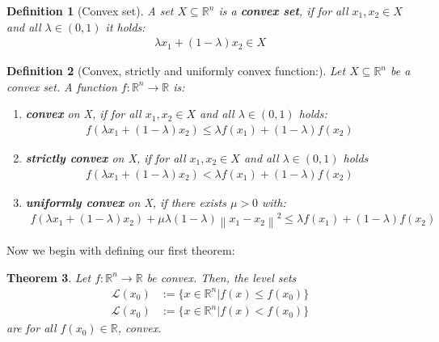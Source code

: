 \documentclass[a4paper, 11pt]{report}
\theoremstyle{break}
\newtheorem{definition}{Definition}[chapter]
\newtheorem{theorem}[definition]{Theorem}
\theoremstyle{proofstyle}
\newcommand{\R}{\mathbb{R}}
\begin{document}
\begin{definition}[Convex set]
	A set $X \subseteq \R^n$  is a \textbf{convex set}, if for all $x_1, x_2\in X$ and all $\lambda\in(0,1)$ it holds: 
	\begin{align}
		\lambda x_1 + (1-\lambda) x_2\in X \label{definition:1:convexset} %
	\end{align}
\end{definition} 

\begin{definition}[Convex, strictly and uniformly convex function:]
	Let $X\subseteq\R^n$ be a convex set. A function $f:\R^n\rightarrow\R$ is:
	\begin{enumerate}   
	    \item \textbf{convex} on X, if for all $x_1, x_2 \in X$ and all $\lambda\in(0,1)$ holds: 
		\begin{align}
		    f(\lambda x_1 + (1-\lambda) x_2) \le \lambda f(x_1)+(1-\lambda)f(x_2)
		    \label{definition:2:convex} %
		\end{align}
	
	     \item \textbf{strictly convex} on X, if for all \(x_1, x_2\in{X}\) and all \(\lambda\in(0,1)\) holds
		\begin{align}
		   f(\lambda{x_1} + (1-\lambda){x_2}) < \lambda f(x_1)+(1-\lambda)f(x_2)
		   \label{definition:3:strictlyconvex}
		\end{align}
		
		\item \textbf{uniformly convex} on X, if there exists $\mu > 0$ with:
		\begin{align}
		    f(\lambda x_1 + (1-\lambda) x_2) + \mu\lambda (1-\lambda)\left\lVert x_1-x_2\right\rVert^2 \le \lambda f(x_1)+(1-\lambda)f(x_2)
		    \label{definition:4:uniconvex}
		\end{align}
	\end{enumerate}  
\end{definition}

Now we begin with defining our first theorem:

\begin{theorem}
	Let $f:\R^n\to\R$ be convex. Then, the level sets
	\begin{align*}
	    \mathcal{L}(x_0) &:= \{ x\in\R^n | f(x)\leq f(x_0) \}  \\
	    \mathcal{L}(x_0) &:= \{ x\in\R^n | f(x) < f(x_0) \}
	\end{align*}
	 are for all $f(x_0)\in\R$, convex.
\end{theorem}
\end{document}
